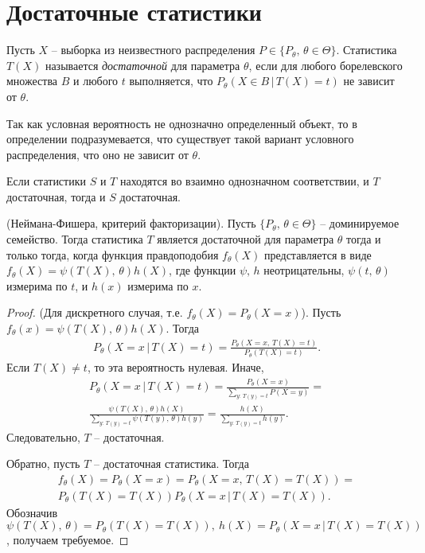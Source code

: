 \section{Достаточные статистики}
\begin{definition}
    Пусть $X$ -- выборка из неизвестного распределения $P \in \{P_\theta,\, \theta \in \Theta\}$. Статистика $T(X)$ называется \textit{достаточной} для параметра $\theta$, если для любого борелевского множества $B$ и любого $t$ выполняется, что $P_\theta(X \in B\, \vert\, T(X) = t)$ не зависит от $\theta$.
\end{definition}
\begin{note}
    Так как условная вероятность не однозначно определенный объект, то в определении подразумевается, что существует такой вариант условного распределения, что оно не зависит от $\theta$.
\end{note}
\begin{note}
    Если статистики $S$ и $T$ находятся во взаимно однозначном соответствии, и $T$ достаточная, тогда и $S$ достаточная.
\end{note}
\begin{theorem} 
    (Неймана-Фишера, критерий факторизации). Пусть $\{P_\theta,\, \theta \in \Theta\}$ -- доминируемое семейство. Тогда статистика $T$ является достаточной для параметра $\theta$ тогда и только тогда, когда функция правдоподобия $f_\theta(X)$ представляется в виде $f_\theta(X) = \psi(T(X),\, \theta)h(X)$, где функции $\psi,\, h$ неотрицательны, $\psi(t,\, \theta)$ измерима по $t$, и $h(x)$ измерима по $x$.
\end{theorem}
\begin{proof}
    (Для дискретного случая, т.е. $f_\theta(X) = P_\theta(X = x)$). Пусть $f_\theta(x) = \psi(T(X),\, \theta)h(X)$. Тогда 
    \begin{gather*}
        P_\theta(X = x\, \vert\, T(X) = t) = \frac{P_\theta(X = x,\, T(X) = t)}{P_\theta(T(X) = t)}.
    \end{gather*}
    Если $T(X) \ne t$, то эта вероятность нулевая. Иначе,
    \begin{gather*}
        P_\theta(X = x\, \vert\, T(X) = t) = \frac{P_\theta (X = x)}{\sum_{y:\, T(y) = t}P(X = y)} =\\ \frac{\psi(T(X),\, \theta)h(X)}{\sum_{y:\, T(y) = t}\psi(T(y),\, \theta)h(y)} = \frac{h(X)}{\sum_{y:\, T(y) = t}h(y)}.
    \end{gather*}
    Следовательно, $T$ -- достаточная.
    
    Обратно, пусть $T$ -- достаточная статистика. Тогда
    \begin{gather*}
        f_\theta(X)=P_\theta(X = x) = P_\theta(X = x,\, T(X) = T(X)) =\\ P_\theta(T(X) = T(X))P_\theta(X = x\, \vert\, T(X) = T(X)).
    \end{gather*}
    Обозначив $\psi(T(X),\, \theta) = P_\theta(T(X) = T(X)),\ h(X) = P_\theta(X = x\, \vert\, T(X) = T(X))$, получаем требуемое.
\end{proof}

